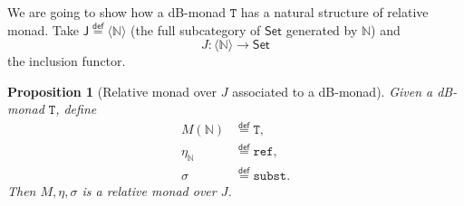 \documentclass[a4paper,twoside,12pt]{article}
\newtheorem{proposition}{Proposition}
\theoremstyle{definition}
\theoremstyle{remark}
\newcommand{\NN}{\mathbb{N}}
\newcommand{\subst}{\mathtt{subst}}
\newcommand{\refe}{\mathtt{ref}}
\newcommand{\TT}{\mathtt{T}}
\begin{document}
We are going to show how a dB-monad $\TT$ has a natural structure of
relative monad.  Take
$\mathsf{J} \stackrel{\mathsf{def}}{=}\langle \NN \rangle$ (the full
subcategory of $\mathsf{Set}$ generated by $\NN$) and
\begin{equation}
  \label{eq:functor_J}
  J\colon \langle \NN \rangle \to \mathsf{Set}
\end{equation}
the inclusion functor.

\begin{proposition}[Relative monad over $J$ associated to a dB-monad]
  Given a dB-monad $\TT$, define
  \begin{align*}
    M(\NN) &\stackrel{\mathsf{def}}{=} \TT, \\
    \eta_\NN &\stackrel{\mathsf{def}}{=} \refe, \\
    \sigma &\stackrel{\mathsf{def}}{=} \subst.
  \end{align*}
  Then $M,\eta,\sigma$ is a relative monad over $J$.
\end{proposition}





\end{document}
